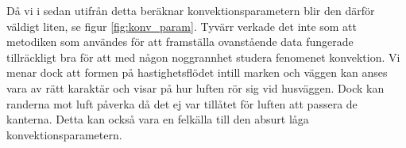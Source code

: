 Då vi i sedan utifrån detta beräknar konvektionsparametern blir den därför väldigt liten, 
se figur \ref{fig:konv_param}. Tyvärr verkade det inte som att metodiken som användes 
för att framställa ovanstående data fungerade tillräckligt bra för att med någon 
noggrannhet studera fenomenet konvektion.  Vi menar dock att formen på hastighetsflödet intill marken och väggen
kan anses vara av rätt karaktär och visar på hur luften rör sig vid husväggen. Dock kan randerna mot
luft påverka då det ej var tillåtet för luften att passera de
kanterna. Detta kan också vara en felkälla till den absurt låga konvektionsparametern.


\begin{figure}[hpbt]
\centering
{}
\vspace{1cm}


\end{figure}
